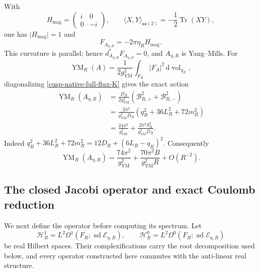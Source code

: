 With
\begin{equation}
 H_{\mathrm{mag}}=\begin{pmatrix}i&0\\0&-i\end{pmatrix},
 \qquad
 \langle X,Y\rangle_{\mathfrak{su}(2)}
 =-\frac12\operatorname{Tr}(XY),
 \label{cusp-native-full-flux-Lie-normalization}
\end{equation}
one has \(\lvert H_{\mathrm{mag}}\rvert=1\) and
\begin{equation}
 F_{A_{\eta,R}}=-2\pi\eta_R H_{\mathrm{mag}}.
 \label{cusp-native-full-flux-SU2-curvature}
\end{equation}
This curvature is parallel; hence
\(d_{A_{\eta,R}}^*F_{A_{\eta,R}}=0\), and \(A_{\eta,R}\) is Yang--Mills.
For
\begin{equation}
 \operatorname{YM}_R(A)=\frac1{2g_{\mathrm{YM}}^2}
 \int_{F_R}|F_A|^2\,\mathrm d\operatorname{vol}_{g_R},
 \label{cusp-native-full-flux-action-normalization}
\end{equation}
diagonalizing \cref{cusp-native-full-flux-K} gives the exact action
\begin{align}
 \operatorname{YM}_R(A_{\eta,R})
 &=\frac{D_R}{2g_{\mathrm{YM}}^2}
   (\mathcal B_{R,+}^2+\mathcal B_{R,-}^2)
 \label{cusp-native-full-flux-action-frequency}\\
 &=\frac{2\pi^2}{g_{\mathrm{YM}}^2D_R}
   (q_R^2+36L_R^2+72m_R^2)
 \label{cusp-native-full-flux-action-coordinate}\\
 &=\frac{24\pi^2}{g_{\mathrm{YM}}^2}
 +\frac{2\pi^2S_R^2}{g_{\mathrm{YM}}^2D_R}.
 \label{cusp-native-full-flux-action-excess}
\end{align}
Indeed
\(q_R^2+36L_R^2+72m_R^2=12D_R+(6L_R-q_R)^2\).
Consequently
\begin{equation}
 \operatorname{YM}_R(A_{\eta,R})
 =\frac{74\pi^2}{g_{\mathrm{YM}}^2}
 +\frac{70\pi^2B}{g_{\mathrm{YM}}^2R}+O(R^{-2}).
 \label{cusp-native-full-flux-action-asymptotic}
\end{equation}

\subsection{The closed Jacobi operator and exact Coulomb reduction}

We next define the operator before computing its spectrum.  Let
\begin{equation}
 \mathscr H_R^1=L^2\Omega^1(F_R;\operatorname{ad}\mathscr E_{\eta,R}),
 \qquad
 \mathscr H_R^0=L^2\Omega^0(F_R;\operatorname{ad}\mathscr E_{\eta,R})
 \label{cusp-native-full-flux-real-Hilbert-spaces}
\end{equation}
be real Hilbert spaces.  Their complexifications carry the root
decomposition used below, and every operator constructed here commutes with
the anti-linear real structure.

